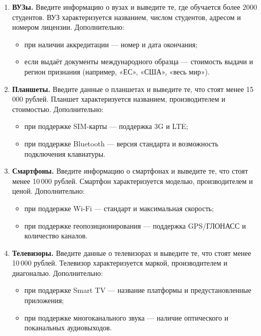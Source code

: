 \begin{enumerate}
    \item \textbf{ВУЗы.}  
    Введите информацию о вузах и выведите те, где обучается более 2000 студентов.  
    ВУЗ характеризуется названием, числом студентов, адресом и номером лицензии.  
    Дополнительно:
    \begin{itemize}
        \item при наличии аккредитации — номер и дата окончания;
        \item если выдаёт документы международного образца — стоимость выдачи и регион признания (например, «ЕС», «США», «весь мир»).
    \end{itemize}

    \item \textbf{Планшеты.}  
    Введите данные о планшетах и выведите те, что стоят менее 15\,000 рублей.  
    Планшет характеризуется названием, производителем и стоимостью.  
    Дополнительно:
    \begin{itemize}
        \item при поддержке SIM-карты — поддержка 3G и LTE;
        \item при поддержке Bluetooth — версия стандарта и возможность подключения клавиатуры.
    \end{itemize}

    \item \textbf{Смартфоны.}  
    Введите информацию о смартфонах и выведите те, что стоят менее 10\,000 рублей.  
    Смартфон характеризуется моделью, производителем и ценой.  
    Дополнительно:
    \begin{itemize}
        \item при поддержке Wi-Fi — стандарт и максимальная скорость;
        \item при поддержке геопозиционирования — поддержка GPS/ГЛОНАСС и количество каналов.
    \end{itemize}

    \item \textbf{Телевизоры.}  
    Введите данные о телевизорах и выведите те, что стоят менее 10\,000 рублей.  
    Телевизор характеризуется маркой, производителем и диагональю.  
    Дополнительно:
    \begin{itemize}
        \item при поддержке Smart TV — название платформы и предустановленные приложения;
        \item при поддержке многоканального звука — наличие оптического и поканальных аудиовыходов.
    \end{itemize}


\end{enumerate}

